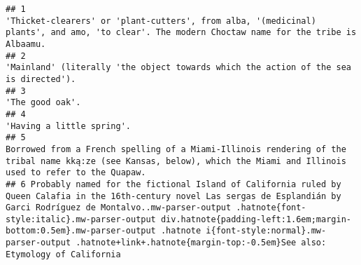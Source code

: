 \documentclass[
]{article}
\begin{document}
\begin{verbatim}
## 1                                                                                                                                                                                                                                                                               'Thicket-clearers' or 'plant-cutters', from alba, '(medicinal) plants', and amo, 'to clear'. The modern Choctaw name for the tribe is Albaamu.
## 2                                                                                                                                                                                                                                                                                                                                         'Mainland' (literally 'the object towards which the action of the sea is directed').
## 3                                                                                                                                                                                                                                                                                                                                                                                                              'The good oak'.
## 4                                                                                                                                                                                                                                                                                                                                                                                                    'Having a little spring'.
## 5                                                                                                                                                                                                                                                       Borrowed from a French spelling of a Miami-Illinois rendering of the tribal name kką:ze (see Kansas, below), which the Miami and Illinois used to refer to the Quapaw.
## 6 Probably named for the fictional Island of California ruled by Queen Calafia in the 16th-century novel Las sergas de Esplandián by Garci Rodríguez de Montalvo..mw-parser-output .hatnote{font-style:italic}.mw-parser-output div.hatnote{padding-left:1.6em;margin-bottom:0.5em}.mw-parser-output .hatnote i{font-style:normal}.mw-parser-output .hatnote+link+.hatnote{margin-top:-0.5em}See also: Etymology of California
\end{verbatim}
\end{document}
